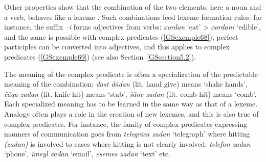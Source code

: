 \documentclass[output=paper
                ,modfonts
                ,nonflat
	        ,collection
	        ,collectionchapter
	        ,collectiontoclongg
 	        ,biblatex
                ,babelshorthands
                ,newtxmath
                ,draftmode
                ,colorlinks, citecolor=brown
]{./langsci/langscibook}
\begin{document}
{	\label{GSexemple67b}
\zl

Other properties show that the combination of the two elements, here a noun and a verb, behaves like a lexeme \citep{bonami2010persian}. Such combinations feed lexeme formation rules: for instance, the suffix \emph{–i} forms adjectives from verbs: \emph{xordan} `eat' > \emph{xordani} `edible', and the same is possible with complex predicates (\ref{GSexemple68}); perfect participles can be converted into adjectives, and this applies to complex predicates (\ref{GSexemple69}) (see also Section~\ref{GSsection5.2}).

\eal 
	\label{GSexemple68} 
    \label{GSexemple68a}
		
    \label{GSexemple68b}
\zl

\eal
	\label{GSexemple69} 
	\label{GSexemple69a}
		
	\label{GSexemple69b}
\zl

The meaning of the complex predicate is often a specialization of the predictable meaning of the combination: \emph{dast d\=adan} (lit. hand give) means `shake hands', \emph{\v c\=aqu zadan} (lit. knife hit) means `stab', \emph{\v s\=ane zadan} (lit. comb hit) means `comb'. Each specialized meaning has to be learned in the same way as that of a lexeme. Analogy often plays a role in the creation of new lexemes, and this is also true of complex predicates. For instance, the family of complex predicates expressing manners of communication goes from \emph{telegr\=am zadan} `telegraph' where hitting \emph{(zadan)} is involved to cases where hitting is not clearly involved: \emph{telefon zadan} `phone’, \emph{imeyl zadan} `email', \emph{esemes zadan} `text' etc.   

}
\end{document}
